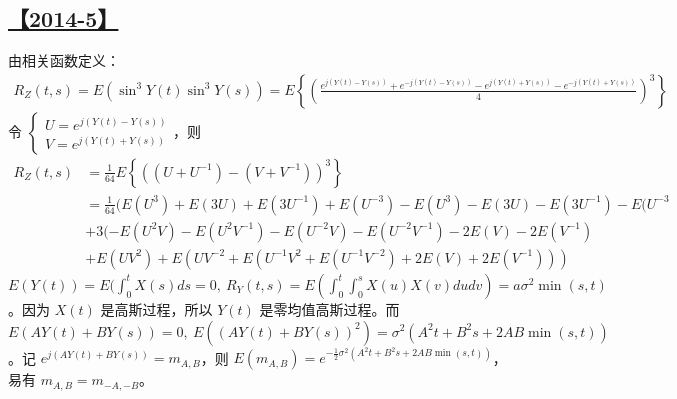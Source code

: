 \subsection{\hyperref[Q2014-5]{【2014-5】}}\label{A2014-5}
由相关函数定义：
\begin{equation}\tag*{}
\begin{split}
R_Z(t, s)=E(\sin^3Y(t)\sin^3Y(s))=E\left\{\left(\frac{e^{j(Y(t)-Y(s))}+e^{-j(Y(t)-Y(s))}-e^{j(Y(t)+Y(s))}-e^{-j(Y(t)+Y(s))}}{4}\right)^3\right\}
\end{split}
\end{equation}
令 $\begin{cases}U=e^{j(Y(t)-Y(s))}\\V=e^{j(Y(t)+Y(s))}\end{cases}$，则
\begin{equation}\tag*{}
\begin{split}
R_Z(t, s)&=\frac{1}{64}E\left\{((U+U^{-1})-(V+V^{-1}))^3\right\}\\
&=\frac{1}{64}(E(U^3)+E(3U)+E(3U^{-1})+E(U^{-3})-E(U^3)-E(3U)-E(3U^{-1})-E(U^{-3}\\
&+3(-E(U^2V)-E(U^2V^{-1})-E(U^{-2}V)-E(U^{-2}V^{-1})-2E(V)-2E(V^{-1})\\
&+E(UV^2)+E(UV^{-2}+E(U^{-1}V^{2}+E(U^{-1}V^{-2})+2E(V)+2E(V^{-1})))
\end{split}
\end{equation}
$E(Y(t))=E(\int_0^tX(s)ds=0,\ R_Y(t, s)=E\left(\int_0^t\int_0^sX(u)X(v)dudv\right)=a\sigma^2\min(s, t)$。因为 $X(t)$ 是高斯过程，所以 $Y(t)$ 是零均值高斯过程。而 $E(AY(t)+BY(s))=0,\ E((AY(t)+BY(s))^2)=\sigma^2(A^2t+B^2s+2AB\min(s, t))$。记 $e^{j(AY(t)+BY(s))}=m_{A, B}$，则 $E(m_{A,B})=e^{-\frac{1}{2}\sigma^2(A^2t+B^2s+2AB\min(s, t))}$，易有 $m_{A,B}=m_{-A, -B}$。

